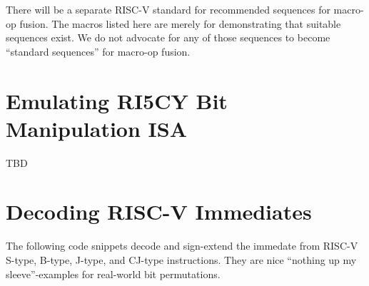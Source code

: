 There will be a separate RISC-V standard for recommended sequences for macro-op fusion.
The macros listed here are merely for demonstrating that suitable sequences exist. We
do not advocate for any of those sequences to become ``standard sequences'' for macro-op
fusion.

\section{Emulating RI5CY Bit Manipulation ISA}

TBD

\section{Decoding RISC-V Immediates}

The following code snippets decode and sign-extend the immedate from RISC-V
S-type, B-type, J-type, and CJ-type instructions. They are nice ``nothing up my
sleeve''-examples for real-world bit permutations.

